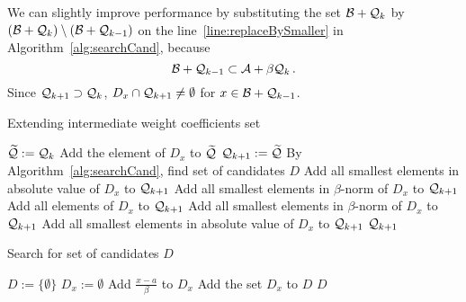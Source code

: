 We can slightly improve performance by substituting the set $\mathcal{B} + \mathcal{Q}_{k}$ by $(\mathcal{B} + \mathcal{Q}_{k})\setminus (\mathcal{B} + \mathcal{Q}_{k-1})$ on the line~\ref{line:replaceBySmaller} in Algorithm~\ref{alg:searchCand}, because
$$
\mathcal{B} + \mathcal{Q}_{k-1} \subset \mathcal{A} + \beta \mathcal{Q}_{k}\,.
$$
Since $\mathcal{Q}_{k+1} \supset \mathcal{Q}_{k}$, $D_x \cap \mathcal{Q}_{k+1} \neq \emptyset$ for  $x\in \mathcal{B} + \mathcal{Q}_{k-1}$.

\begin{algorithm}
  \caption{Extending intermediate weight coefficients set}
    \label{alg:extendWeightCoefSet}
  \begin{algorithmic}[1]
    \STATE $\widetilde{\mathcal{Q}}:=\mathcal{Q}_{k}$
		    	\STATE Add the element of $D_x$ to $\widetilde{\mathcal{Q}}$
			\ENDIF
		\ENDFOR
	\ENDIF
    \STATE $\mathcal{Q}_{k+1}:=\widetilde{\mathcal{Q}}$
    \STATE By Algorithm~\ref{alg:searchCand}, find set of candidates $D$
	        	\STATE Add all smallest elements in absolute value of $D_x$ to $\mathcal{Q}_{k+1}$
	        	\STATE Add all smallest elements in $\beta$-norm of $D_x$ to $\mathcal{Q}_{k+1}$
	        	\STATE Add all elements of $D_x$ to $\mathcal{Q}_{k+1}$
	        	\STATE Add all smallest elements in $\beta$-norm of $D_x$ to $\mathcal{Q}_{k+1}$
	        	\STATE Add all smallest elements in absolute value of $D_x$ to $\mathcal{Q}_{k+1}$ 
	        \ENDIF
        \ENDIF
    \ENDFOR
    \RETURN $\mathcal{Q}_{k+1}$
  \end{algorithmic}
\end{algorithm}



\begin{algorithm}
  \caption{Search for set of candidates $D$}
    \label{alg:searchCand}
  \begin{algorithmic}[1]
    \STATE $D:=\{\emptyset\}$
     \label{line:replaceBySmaller}
      \STATE $D_x:=\emptyset$
              \STATE Add $\frac{x-a}{\beta}$ to $D_x$
            \ENDIF
      \ENDFOR 
      \STATE Add the set $D_x$ to $D$
  \ENDFOR
  \RETURN $D$
  \end{algorithmic}
\end{algorithm}  
